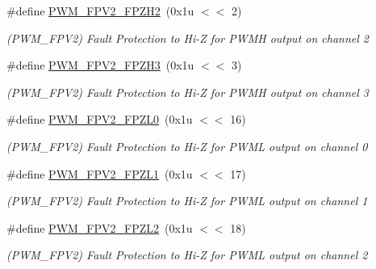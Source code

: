 \begin{DoxyCompactItemize}
\#define \mbox{\hyperlink{group__SAME70__PWM_gabdd5ede76d1d9f0eb5df161a76c9aa33}{P\+W\+M\+\_\+\+F\+P\+V2\+\_\+\+F\+P\+Z\+H2}}~(0x1u $<$$<$ 2)
\begin{DoxyCompactList}\small\item\em (P\+W\+M\+\_\+\+F\+P\+V2) Fault Protection to Hi-\/Z for P\+W\+MH output on channel 2 \end{DoxyCompactList}\item 
\mbox{\label{group__SAME70__PWM_gaa59d7dd046e39434bffb3cf9898a1300}} 
\#define \mbox{\hyperlink{group__SAME70__PWM_gaa59d7dd046e39434bffb3cf9898a1300}{P\+W\+M\+\_\+\+F\+P\+V2\+\_\+\+F\+P\+Z\+H3}}~(0x1u $<$$<$ 3)
\begin{DoxyCompactList}\small\item\em (P\+W\+M\+\_\+\+F\+P\+V2) Fault Protection to Hi-\/Z for P\+W\+MH output on channel 3 \end{DoxyCompactList}\item 
\mbox{\label{group__SAME70__PWM_ga6d62ea6f94ef657bc673108d69c2fb0c}} 
\#define \mbox{\hyperlink{group__SAME70__PWM_ga6d62ea6f94ef657bc673108d69c2fb0c}{P\+W\+M\+\_\+\+F\+P\+V2\+\_\+\+F\+P\+Z\+L0}}~(0x1u $<$$<$ 16)
\begin{DoxyCompactList}\small\item\em (P\+W\+M\+\_\+\+F\+P\+V2) Fault Protection to Hi-\/Z for P\+W\+ML output on channel 0 \end{DoxyCompactList}\item 
\mbox{\label{group__SAME70__PWM_ga147127b7839716910ce218d2d95a6bfb}} 
\#define \mbox{\hyperlink{group__SAME70__PWM_ga147127b7839716910ce218d2d95a6bfb}{P\+W\+M\+\_\+\+F\+P\+V2\+\_\+\+F\+P\+Z\+L1}}~(0x1u $<$$<$ 17)
\begin{DoxyCompactList}\small\item\em (P\+W\+M\+\_\+\+F\+P\+V2) Fault Protection to Hi-\/Z for P\+W\+ML output on channel 1 \end{DoxyCompactList}\item 
\mbox{\label{group__SAME70__PWM_ga8dfd8292ee88bbc5d29dfbd95ee13fa5}} 
\#define \mbox{\hyperlink{group__SAME70__PWM_ga8dfd8292ee88bbc5d29dfbd95ee13fa5}{P\+W\+M\+\_\+\+F\+P\+V2\+\_\+\+F\+P\+Z\+L2}}~(0x1u $<$$<$ 18)
\begin{DoxyCompactList}\small\item\em (P\+W\+M\+\_\+\+F\+P\+V2) Fault Protection to Hi-\/Z for P\+W\+ML output on channel 2 \end{DoxyCompactList}\item 
$$
\end{DoxyCompactItemize}
